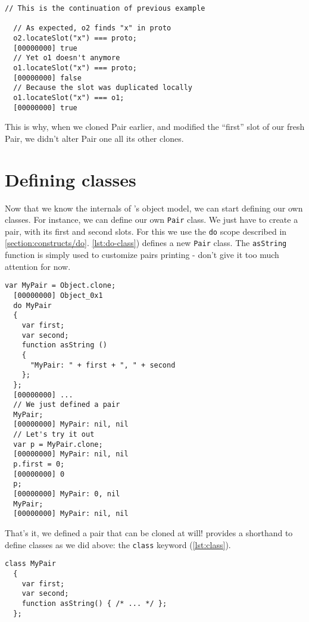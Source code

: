 \documentclass[openright,twoside,12pt]{report}
\begin{document}
\begin{lstlisting}[caption=Inspecting copy on write,
  label=lst:check-copy-on-write]
  // This is the continuation of previous example

  // As expected, o2 finds "x" in proto
  o2.locateSlot("x") === proto;
  [00000000] true
  // Yet o1 doesn't anymore
  o1.locateSlot("x") === proto;
  [00000000] false
  // Because the slot was duplicated locally
  o1.locateSlot("x") === o1;
  [00000000] true
\end{lstlisting}

This is why, when we cloned Pair earlier, and modified the ``first''
slot of our fresh Pair, we didn't alter Pair one all its other clones.

\section{Defining classes}

Now that we know the internals of \urbi's object model, we can start
defining our own classes. For instance, we can define our own
\texttt{Pair} class. We just have to create a pair, with its first and
second slots. For this we use the \texttt{do} scope described in
\autoref{section:constructs/do}. \autoref{lst:do-class}) defines a new
\texttt{Pair} class. The \texttt{asString} function is simply used to
customize pairs printing - don't give it too much attention for now.

\begin{lstlisting}[caption=Defining our own \texttt{MyPair} class,
  label=lst:do-class]
  var MyPair = Object.clone;
  [00000000] Object_0x1
  do MyPair
  {
    var first;
    var second;
    function asString ()
    {
      "MyPair: " + first + ", " + second
    };
  };
  [00000000] ...
  // We just defined a pair
  MyPair;
  [00000000] MyPair: nil, nil
  // Let's try it out
  var p = MyPair.clone;
  [00000000] MyPair: nil, nil
  p.first = 0;
  [00000000] 0
  p;
  [00000000] MyPair: 0, nil
  MyPair;
  [00000000] MyPair: nil, nil
\end{lstlisting}

That's it, we defined a pair that can be cloned at will! \urbi
provides a shorthand to define classes as we did above: the
\texttt{class} keyword (\autoref{lst:class}).

\begin{lstlisting}[caption=Using the \texttt{class} construct,
  label=lst:class]
  class MyPair
  {
    var first;
    var second;
    function asString() { /* ... */ };
  };
\end{lstlisting}
\end{document}
